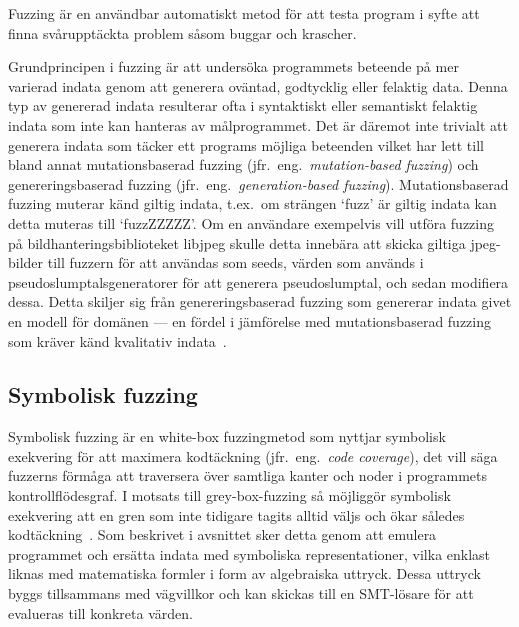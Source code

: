 Fuzzing är en användbar automatiskt metod för att testa program i syfte att finna
svårupptäckta problem såsom buggar och krascher.

Grundprincipen i fuzzing är att undersöka programmets beteende på mer varierad
indata genom att generera oväntad, godtycklig eller felaktig data. Denna typ av
genererad indata resulterar ofta i syntaktiskt eller semantiskt felaktig indata
som inte kan hanteras av målprogrammet. Det är däremot inte trivialt att generera
indata som täcker ett programs möjliga beteenden vilket har lett till bland annat
mutationsbaserad fuzzing (jfr.\ eng.\ \emph{mutation-based fuzzing}) och genereringsbaserad
fuzzing (jfr.\ eng.\ \emph{generation-based fuzzing}). Mutationsbaserad fuzzing muterar känd giltig indata,
t.ex.\ om strängen `fuzz' är giltig indata kan detta muteras till `fuzzZZZZZ'. Om
en användare exempelvis vill utföra fuzzing på bildhanteringsbiblioteket libjpeg skulle
detta innebära att skicka giltiga jpeg-bilder till fuzzern för att användas som
seeds, värden som används i pseudoslumptalsgeneratorer för att generera
pseudoslumptal, och sedan modifiera dessa. Detta skiljer sig från
genereringsbaserad fuzzing som genererar indata givet en modell för domänen ---
en fördel i jämförelse med mutationsbaserad fuzzing som kräver känd kvalitativ
indata~\cite{fuzzing}.

\subsection{Symbolisk fuzzing} Symbolisk fuzzing är en white-box fuzzingmetod
som nyttjar symbolisk exekvering för att maximera kodtäckning (jfr.\ eng.\ \emph{code coverage}), det vill säga fuzzerns
förmåga att traversera över samtliga kanter och noder i programmets kontrollflödesgraf.
I motsats till grey-box-fuzzing så möjliggör symbolisk exekvering att en gren som inte tidigare tagits alltid väljs
och ökar således kodtäckning~\cite{challenges_fuzzing}. Som beskrivet i avsnittet 
sker detta genom att emulera programmet och ersätta indata med symboliska representationer, vilka enklast liknas med
matematiska formler i form av algebraiska uttryck. Dessa uttryck byggs tillsammans med vägvillkor
och kan skickas till en SMT-lösare för att evalueras till konkreta värden.

